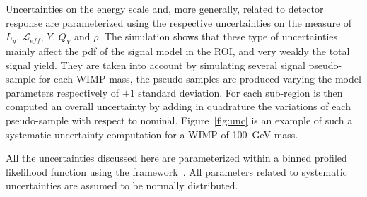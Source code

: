 Uncertainties on the energy scale and, more generally, related to detector response 
are parameterized using the respective uncertainties on the measure of $L_y$, $\mathcal{L}_{eff}$, $Y$, $Q_Y$ and $\rho$. The simulation shows 
that these type of uncertainties mainly affect the pdf of the signal model in the ROI, and very weakly the total signal yield. 
They are taken into account by simulating several signal pseudo-sample for each WIMP mass, the pseudo-samples are produced varying the model parameters respectively of $\pm 1$ standard deviation. 
For each sub-region is then computed an overall uncertainty by adding in quadrature the variations of each pseudo-sample 
with respect to nominal. Figure~\ref{fig:unc} is an example of such a systematic uncertainty computation for a WIMP of 100~GeV mass.


All the uncertainties discussed here are parameterized within a binned profiled likelihood function using the framework~\cite{roostat,roofit}.
All parameters related to systematic uncertainties are assumed to be normally distributed.


















